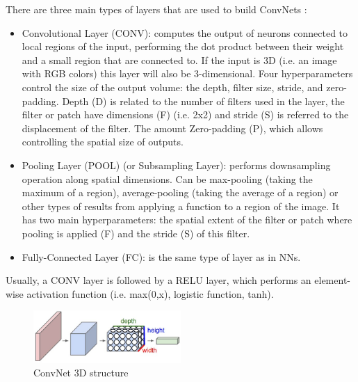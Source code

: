 \documentclass[]{article}
\begin{document}
There are three main types of layers that are used to build ConvNets \cite{cs231convnets}: %
\begin{itemize}
	\item Convolutional Layer (CONV): computes the output of neurons connected to local regions of the input, performing the dot product between their weight and a small region that are connected to. If the input is 3D (i.e. an image with RGB colors) this layer will also be 3-dimensional. Four hyperparameters control the size of the output volume: the depth, filter size, stride, and zero-padding. Depth (D) is related to the number of filters used in the layer, the filter or patch have dimensions (F) (i.e. 2x2) and stride (S) is referred to the displacement of the filter. The amount Zero-padding (P), which allows controlling the spatial size of outputs.
	\item Pooling Layer (POOL) (or Subsampling Layer): performs downsampling operation along spatial dimensions. Can be max-pooling (taking the maximum of a region), average-pooling (taking the average of a region) or other types of results from applying a function to a region of the image. It has two main hyperparameters: the spatial extent of the filter or patch where pooling is applied (F) and the stride (S) of this filter.
	\item Fully-Connected Layer (FC): is the same type of layer as in NNs.
\end{itemize}

Usually, a CONV layer is followed by a RELU layer, which performs an element-wise activation function (i.e. max(0,x), logistic function, tanh).

\begin{figure}[htpb!]
\centering
\includegraphics[width= 0.5\textwidth]{images/cnn}
\caption{ConvNet 3D structure \cite{cs231convnets}\label{img:cnn}}
\end{figure}
\end{document}
